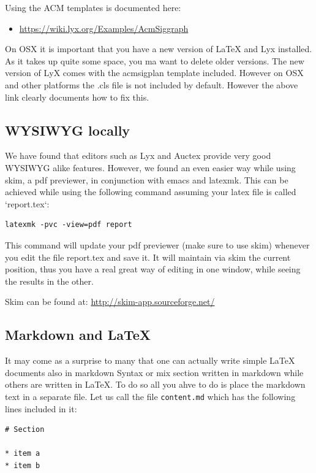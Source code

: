 Using the ACM templates is documented here:

\begin{itemize}

\item
  \url{https://wiki.lyx.org/Examples/AcmSiggraph}
\end{itemize}

On OSX it is important that you have a new version of LaTeX and Lyx
installed. As it takes up quite some space, you ma want to delete older
versions. The new version of LyX comes with the acmsigplan template
included. However on OSX and other platforms the .cls file is not
included by default. However the above link clearly documents how to fix
this.

\subsection{WYSIWYG locally}\label{wysiwyg-locally}

We have found that editors such as Lyx and Auctex provide very good
WYSIWYG alike features. However, we found an even easier way while using
skim, a pdf previewer, in conjunction with emacs and latexmk. This can
be achieved while using the following command assuming your latex file
is called `report.tex`:

\begin{verbatim}
latexmk -pvc -view=pdf report
\end{verbatim}

This command will update your pdf previewer (make sure to use skim)
whenever you edit the file report.tex and save it. It will maintain via
skim the current position, thus you have a real great way of editing in
one window, while seeing the results in the other.

Skim can be found at: \url{http://skim-app.sourceforge.net/}

\subsection{Markdown and \LaTeX}

It may come as a surprise to many that one can actually write simple
LaTeX documents also in markdown Syntax or mix section written in
markdown while others are written in LaTeX. To do so all you ahve to
do is place the markdown text in a separate file. Let us call the file 
\verb|content.md| which has the following lines included in it:

\begin{verbatim}
# Section

* item a
* item b
\end{verbatim}

